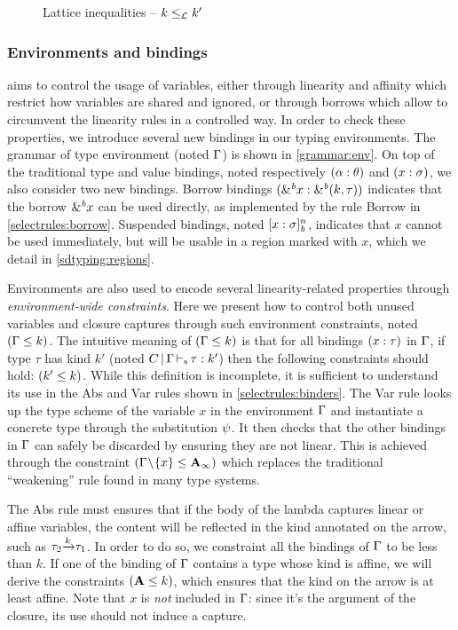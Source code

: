 \begin{figure*}[!h]
  
  \caption{Lattice inequalities -- $k \leq_\mathcal L k'$}
  \label{sdtyp:lattice}
\end{figure*}


\subsubsection{Environments and bindings}
\label{sdtyping:envs}

\lang aims to control the usage of variables, either
through
linearity and affinity which restrict how variables are shared and ignored,
or through borrows which allow to circumvent the linearity rules
in a controlled way.
In order to check these properties, we introduce several new bindings
in our typing environments.
The grammar of type environment (noted $\Gamma$) is shown in \cref{grammar:env}.
On top of the traditional type and value bindings, noted respectively
$(\alpha : \theta)$ and $(x : \sigma)$, we also consider two new
bindings.
Borrow bindings $({\&}^{\textit{b}}x : {\&}^{\textit{b}}(k,\tau))$ indicates
that the borrow ${\&}^{\textit{b}}x$ can be used directly, as implemented
by the rule {\sc Borrow} in \cref{selectrules:borrow}.
Suspended bindings, noted $[x : \sigma]_{\textit{b}}^n$, indicates that $x$
cannot be used immediately, but will be usable in a region
marked with $x$, which we detail in \cref{sdtyping:regions}.

Environments are also used to encode several linearity-related properties
through \emph{environment-wide constraints}.
Here we present how to control both unused variables and
closure captures through such environment constraints, noted $(\Gamma \leq k)$.
The intuitive meaning of $(\Gamma \leq k)$ is that for all bindings
$(x : \tau)$ in $\Gamma$,
if type $\tau$ has kind $k'$ (noted $C \operatorname{|} \Gamma \operatorname{\vdash_s} \tau : k'$)
then the following constraints should hold: $(k' \leq k)$.
While this definition is incomplete, it is sufficient to understand
its use in the {\sc Abs} and {\sc Var} rules shown in \cref{selectrules:binders}.
%
The {\sc Var} rule looks up the type scheme of the variable $x$ in
the environment $\Gamma$
and instantiate a concrete type through the substitution $\mathrm{\psi}$. It then
checks that the other bindings in $\Gamma$ can safely be discarded by
ensuring they are not linear. This is achieved through the constraint
$(\Gamma\!\setminus\!\{x\} \leq \mathbf{A}_\infty)$ which replaces the traditional
``weakening'' rule found in many type systems.

The {\sc Abs} rule must ensures that if the body of the lambda captures
linear or affine variables, the content will be reflected in the kind
annotated on the arrow, such as $\tau_2 {\xrightarrow{k}} \tau_1$.
In order to do so, we constraint all the bindings of $\Gamma$ to be less than $k$.
If one of the binding of $\Gamma$ contains a type whose kind is affine,
we will derive the constraints $(\mathbf{A} \leq k)$, which ensures that
the kind on the arrow is at least affine.
Note that $x$ is \emph{not} included in $\Gamma$: since it's the argument of the
closure, its use should not induce a capture.

